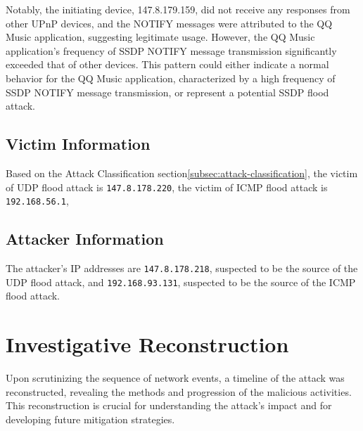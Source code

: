 \documentclass{article}
\begin{document}
    Notably, the initiating device, 147.8.179.159, did not receive any responses from other UPnP devices, 
    and the NOTIFY messages were attributed to the QQ Music application, 
    suggesting legitimate usage. 
    However, the QQ Music application's frequency of SSDP NOTIFY message transmission significantly exceeded that of other devices. 
    This pattern could either indicate a normal behavior for the QQ Music application, 
    characterized by a high frequency of SSDP NOTIFY message transmission, or represent a potential SSDP flood attack.

    \subsection{Victim Information}\label{subsec:victim-information}
    
    Based on the Attack Classification section\ref{subsec:attack-classification}, 
    the victim of UDP flood attack is \lstinline|147.8.178.220|, 
    the victim of ICMP flood attack is \lstinline|192.168.56.1|,

    \subsection{Attacker Information}\label{subsec:attacker-information}

    The attacker's IP addresses are \lstinline|147.8.178.218|, suspected to be the source of the UDP flood attack,
    and \lstinline|192.168.93.131|, suspected to be the source of the ICMP flood attack.

    
    \section{\fontsize{14pt}{17pt}\selectfont Investigative Reconstruction}\label{sec:selectfont-investigative-reconstruction}
    Upon scrutinizing the sequence of network events, a timeline of the attack was reconstructed,
    revealing the methods and progression of the malicious activities.
    This reconstruction is crucial for understanding the attack's impact and for developing future mitigation strategies.
\end{document}
